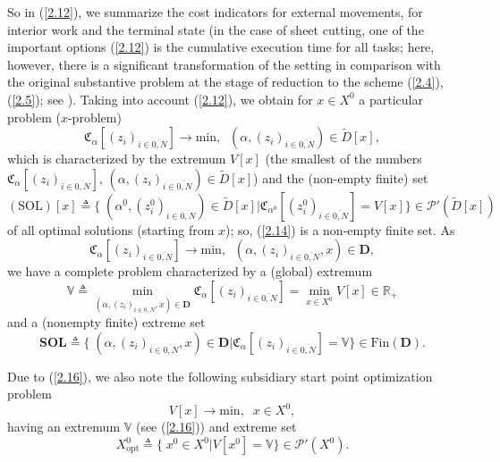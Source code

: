 So in (\ref{2.12}),
we summarize the cost indicators for external movements,
for interior work and the terminal state
(in the case of sheet cutting,
one of the important options (\ref{2.12})
is the cumulative execution time for all tasks;
here, however,
there is a significant transformation of the setting
in comparison with the original substantive problem
at the stage of reduction to the scheme
 (\ref{2.4}), (\ref{2.5});
see \cite[$\S$3.3]{4}).
Taking into account (\ref{2.12}),
we obtain for
$ x \in X ^ 0 $
a particular problem
($ x $-problem)
\begin{equation}\label{2.13}
  \mathfrak{C}_{\alpha}[(z_i)_{i \in \overline{0,N}}] \longrightarrow
  \mathrm{min},\;\;(\alpha,(z_i)_{i \in \overline{0,N}}) \in \tilde{D}[x],
\end{equation}
which is characterized by the extremum
$V[x]$
(the smallest of the numbers
$\mathfrak{C}_{\alpha}[(z_i)_{i \in \overline{0,N}}]$,
$(\alpha,(z_i)_{i \in \overline{0,N}}) \in \tilde{D}[x]$)
and the
(non-empty finite)
set
\begin{equation}\label{2.14}
  (\mathrm{SOL})[x] {\triangleq}
  \{\;(\alpha^0,(z_i^0)_{i \in \overline{0,N}}) \in \tilde{D}[x] \vert
  \mathfrak{C}_{\alpha^0}[(z_i^0)_{i \in \overline{0,N}}] = V[x]\} \in \mathcal{P}'(\tilde{D}[x])
\end{equation}
of all optimal solutions
(starting from $x$);
so,
 (\ref{2.14})
is a non-empty finite set.
As
\begin{equation}\label{2.15}
  \mathfrak{C}_{\alpha}[(z_i)_{i \in \overline{0,N}}] \longrightarrow
  \mathrm{min},\;\;(\alpha,(z_i)_{i \in \overline{0,N}},x) \in \mathbf{D},
\end{equation}
we have a complete problem characterized by a (global) extremum
\begin{equation}\label{2.16}
  \mathbb{V} {\triangleq}
  \min\limits_{(\alpha,(z_i)_{i \in \overline{0,N}},x) \in
  \mathbf{D}}\mathfrak{C}_{\alpha}[(z_i)_{i \in \overline{0,N}}]
  = \min\limits_{x \in X^0} V[x] \in \mathbb{R}_+
\end{equation}
and a (nonempty finite) extreme set
\begin{equation}\label{2.17}
  \mathbf{SOL} {\triangleq}
  \{\;(\alpha,(z_i)_{i \in \overline{0,N}},x) \in \mathbf{D}
  \vert \mathfrak{C}_{\alpha}[(z_i)_{i \in \overline{0,N}}] =
  \mathbb{V}\} \in \mathrm{Fin}(\mathbf{D}).
\end{equation}

Due to (\ref{2.16}),
we also note the following
subsidiary
start point optimization problem
\begin{equation}\label{2.18}
  V[x] \longrightarrow \mathrm{min},\;\;x \in X^0,
\end{equation}
having an extremum
$\mathbb{V}$
(see (\ref{2.16}))
and extreme set
\begin{equation}\label{2.19}
  X^0_{\mathrm{opt}} {\triangleq} \{\;x^0 \in X^0 \vert V[x^0] = \mathbb{V}\} \in \mathcal{P}'(X^0).
\end{equation}

